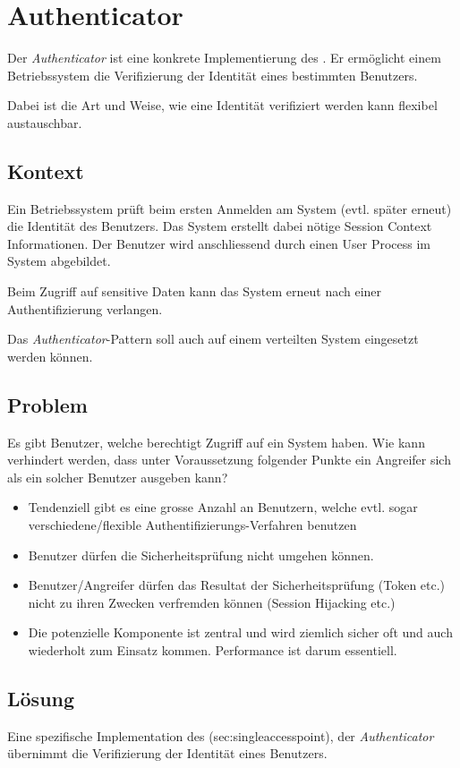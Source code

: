 \section{Authenticator}

Der \emph{Authenticator} ist eine konkrete Implementierung des . Er ermöglicht einem Betriebssystem die Verifizierung der Identität eines bestimmten Benutzers.

Dabei ist die Art und Weise, wie eine Identität verifiziert werden kann flexibel austauschbar.


\subsection*{Kontext}
Ein Betriebssystem prüft beim ersten Anmelden am System (evtl. später erneut) die Identität des Benutzers. Das System erstellt dabei nötige Session Context Informationen. Der Benutzer wird anschliessend durch einen User Process im System abgebildet.

Beim Zugriff auf sensitive Daten kann das System erneut nach einer Authentifizierung verlangen.

Das \emph{Authenticator}-Pattern soll auch auf einem verteilten System eingesetzt werden können.


\subsection*{Problem}
Es gibt Benutzer, welche berechtigt Zugriff auf ein System haben. Wie kann verhindert werden, dass unter Voraussetzung folgender Punkte ein Angreifer sich als ein solcher Benutzer ausgeben kann?

\begin{itemize}
	\item Tendenziell gibt es eine grosse Anzahl an Benutzern, welche evtl. sogar verschiedene/flexible Authentifizierungs-Verfahren benutzen
	\item Benutzer dürfen die Sicherheitsprüfung nicht umgehen können.
	\item Benutzer/Angreifer dürfen das Resultat der Sicherheitsprüfung (Token etc.) nicht zu ihren Zwecken verfremden können (Session Hijacking etc.)
	\item Die potenzielle Komponente ist zentral und wird ziemlich sicher oft und auch wiederholt zum Einsatz kommen. Performance ist darum essentiell.
\end{itemize}


\subsection*{Lösung}
Eine spezifische Implementation des \nameref(sec:singleaccesspoint), der \emph{Authenticator} übernimmt die Verifizierung der Identität eines Benutzers.

